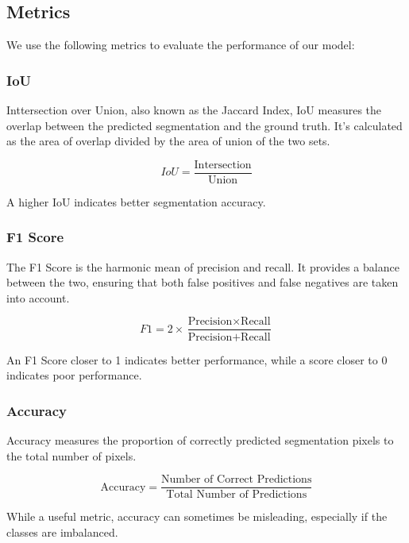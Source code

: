 \documentclass[11pt, a4paper,oneside,chapterprefix=false]{scrbook}
\begin{document}
\subsection{Metrics}

We use the following metrics to evaluate the performance of our model:

\subsubsection{IoU}

Inttersection over Union, also known as the Jaccard Index, IoU measures the overlap between the predicted segmentation and the ground truth. It's calculated as the area of overlap divided by the area of union of the two sets.

\begin{equation}
	IoU = \frac{\text{Intersection}}{\text{Union}}
\end{equation}

A higher IoU indicates better segmentation accuracy.

\subsubsection{F1 Score}

The F1 Score is the harmonic mean of precision and recall. It provides a balance between the two, ensuring that both false positives and false negatives are taken into account.

\begin{equation}
	F1 = 2 \times \frac{\text{Precision} \times \text{Recall}}{\text{Precision} + \text{Recall}}
\end{equation}

An F1 Score closer to 1 indicates better performance, while a score closer to 0 indicates poor performance.

\subsubsection{Accuracy}

Accuracy measures the proportion of correctly predicted segmentation pixels to the total number of pixels.

\begin{equation}
	\text{Accuracy} = \frac{\text{Number of Correct Predictions}}{\text{Total Number of Predictions}}
\end{equation}

While a useful metric, accuracy can sometimes be misleading, especially if the classes are imbalanced.
\end{document}
